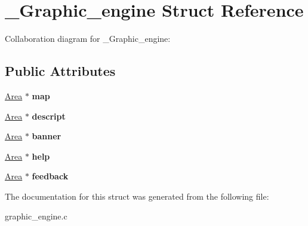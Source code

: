 \hypertarget{struct__Graphic__engine}{}\section{\+\_\+\+Graphic\+\_\+engine Struct Reference}
\label{struct__Graphic__engine}


Collaboration diagram for \+\_\+\+Graphic\+\_\+engine\+:
\subsection*{Public Attributes}
\begin{DoxyCompactItemize}
\item 
\mbox{\label{struct__Graphic__engine_a1ea06bb881d335da8c31d63b3e834bdb}} 
\hyperlink{struct__Area}{Area} $\ast$ {\bfseries map}
\item 
\mbox{\label{struct__Graphic__engine_a8a4927aedd398b43f86c871f197edf1d}} 
\hyperlink{struct__Area}{Area} $\ast$ {\bfseries descript}
\item 
\mbox{\label{struct__Graphic__engine_a37d117af941b6aa825bb3dff24fe9e27}} 
\hyperlink{struct__Area}{Area} $\ast$ {\bfseries banner}
\item 
\mbox{\label{struct__Graphic__engine_a96833ee68d6330b61014979614f7fb77}} 
\hyperlink{struct__Area}{Area} $\ast$ {\bfseries help}
\item 
\mbox{\label{struct__Graphic__engine_aaae226ce3b87e512ec196f792ed2f552}} 
\hyperlink{struct__Area}{Area} $\ast$ {\bfseries feedback}
\end{DoxyCompactItemize}


The documentation for this struct was generated from the following file\+:\begin{DoxyCompactItemize}
\item 
graphic\+\_\+engine.\+c\end{DoxyCompactItemize}
